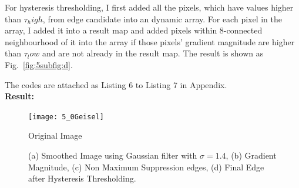 \documentclass{assignment}
\begin{document}
\begin{problemlist}
For hysteresis thresholding, I first added all the pixels, which have values higher than $\tau_high$, from edge candidate into an dynamic array. For each pixel in the array, I added it into a result map and added pixels within 8-connected neighbourhood of it into the array if those pixels' gradient magnitude are higher than $\tau_low$ and are not already in the result map. The result is shown as Fig.~\ref{fig:5subfig:d}.

The codes are attached as Listing 6 to Listing 7 in Appendix.\\

\textbf{Result:}

\begin{figure}[H]
\begin{center}
    \texttt{[image: 5\_0Geisel]}
    \caption{Original Image}
    \label{fig:5geisel}
\end{center}
\end{figure}

\begin{figure}[H]
    \begin{center}
        \hspace{0.5in}
        \label{fig:images}
        \vspace{0.5cm}
        \hspace{0.5in}
        \caption{(a) Smoothed Image using Gaussian filter with $\sigma = 1.4$, (b) Gradient Magnitude, (c) Non Maximum Suppression edges, (d) Final Edge after Hysteresis Thresholding.}
        \label{fig:5images}
    \end{center}
\end{figure}


\end{problemlist}
\end{document}
